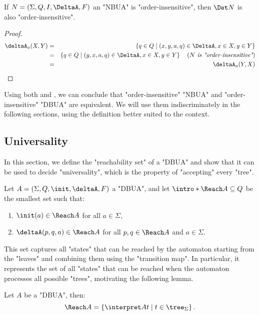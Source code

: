\documentclass[a4paper,UKenglish,cleveref, autoref, thm-restate]{lipics-v2021}
\begin{document}
\begin{lemma}\label{lem:order-insensitive-det}
	If $N = \NBUA$ an "NBUA" is "order-insensitive", then $\Det N$ is also "order-insensitive".
\end{lemma}

\begin{proof}
	\begin{eqnarray*}
		\deltaA_a (X,Y) &=& \setdef {q \in Q} {(x,y,a,q) \in \DeltaA, x \in X, y \in Y} \\
		&=& \setdef {q \in Q} {(y,x,a,q) \in \DeltaA, x \in X, y \in Y}  \reason {$N$ is "order-insensitive"} \\
		&=& \deltaA_a (Y,X)
	\end{eqnarray*}
\end{proof}


Using both  and , we can conclude that "order-insensitive" "NBUA" and "order-insensitive" "DBUA" are equivalent. We will
use them indiscriminately in the following sections, using the definition better suited to the context.

\subsection{Universality}\label{sec:UniversalityAutomata}

In this section, we define the "reachability set" of a "DBUA" and show that it can be used to decide "universality", which is the property of "accepting" every "tree".

\begin{definition}
	\AP Let $A = \DBUA$ a "DBUA", and let $\intro* \Reach A \subseteq Q$ be the smallest set such that:
	\begin{enumerate}
		\item $\init(a) \in \Reach A$ for all $a \in \Sigma$,
		\item $\deltaA(p, q, a) \in \Reach A$ for all $p, q \in \Reach A$ and $a \in \Sigma$.
	\end{enumerate}
\end{definition}

This set captures all "states" that can be reached by the automaton starting from the "leaves" and combining them using the "transition map".
In particular, it represents the set of all "states" that can be reached when the automaton processes all possible "trees", motivating the following lemma.

\begin{lemma}
	Let $A$ be a "DBUA", then:
	\[
		\Reach A = \setdef {\interpret A t} {t \in \tree_\Sigma}.
	\]
\end{lemma}
\end{document}
